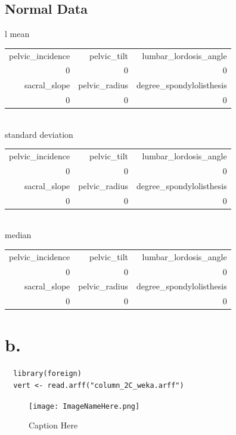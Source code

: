 \documentclass{report}
\begin{document}
\subsection{Normal Data}

\begin{tabular}{l}
  mean \\
  \hskip 1.0cm\begin{tabular}{rrr}
    pelvic\_incidence & pelvic\_tilt & lumbar\_lordosis\_angle \\
    0 & 0 & 0 \\
    sacral\_slope & pelvic\_radius & degree\_spondylolisthesis \\
    0 & 0 & 0 \\
  \end{tabular} \\
  standard deviation \\
  \hskip 1.0cm\begin{tabular}{rrr}
    pelvic\_incidence & pelvic\_tilt & lumbar\_lordosis\_angle \\
    0 & 0 & 0 \\
    sacral\_slope & pelvic\_radius & degree\_spondylolisthesis \\
    0 & 0 & 0 \\
  \end{tabular} \\
  median \\
  \hskip 1.0cm\begin{tabular}{rrr}
    pelvic\_incidence & pelvic\_tilt & lumbar\_lordosis\_angle \\
    0 & 0 & 0 \\
    sacral\_slope & pelvic\_radius & degree\_spondylolisthesis \\
    0 & 0 & 0 \\
  \end{tabular}
\end{tabular}

\section{b.}

\begin{verbatim}
  library(foreign)
  vert <- read.arff("column_2C_weka.arff")
\end{verbatim}

\begin{figure}[h!]
  \texttt{[image: ImageNameHere.png]}
  \caption{Caption Here}
  \label{fig:LabelHere}
\end{figure}
\end{document}

